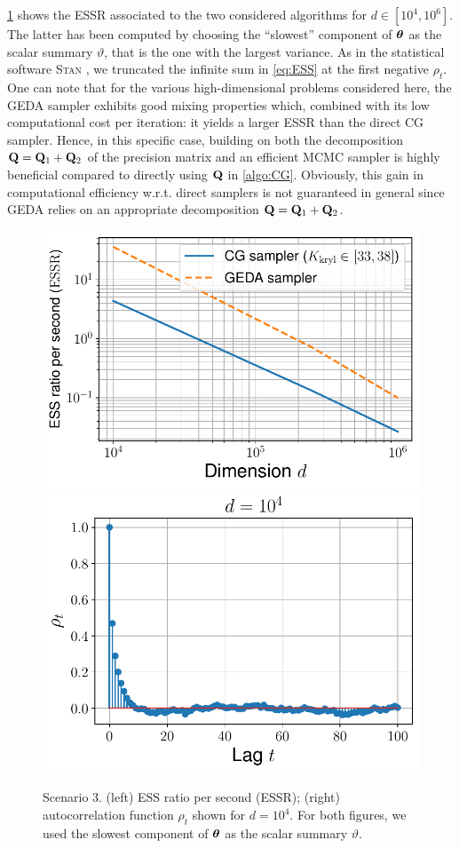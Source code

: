 \documentclass[nohypdvips,onefignum,onetabnum]{siamart171218}
\begin{document}
\cref{fig:scenario_3_results} shows the ESSR associated to the two considered algorithms for $d \in [10^4,10^6]$.
The latter has been computed by choosing the ``slowest'' component of $\boldsymbol{\theta}$ as the scalar summary $\vartheta$, that is the one with the largest variance.
As in the statistical software \textsc{Stan} \cite{Stan2017}, we truncated the infinite sum in \cref{eq:ESS} at the first negative $\rho_t$.
One can note that for the various high-dimensional problems considered here, the GEDA sampler exhibits good mixing properties which, combined with its low computational cost per iteration: it yields a larger ESSR than the direct CG sampler.
Hence, in this specific case, building on both the decomposition $\mathbf{Q} = \mathbf{Q}_1 + \mathbf{Q}_2$ of the precision matrix and an efficient MCMC sampler is highly beneficial compared to directly using $\mathbf{Q}$ in \cref{algo:CG}.
Obviously, this gain in computational efficiency w.r.t. direct samplers is not guaranteed in general since GEDA relies on an appropriate decomposition $\mathbf{Q} = \mathbf{Q}_1 + \mathbf{Q}_2$.
%
\begin{figure}
  \mbox{{\includegraphics[scale=0.45]{images/simu3_ESS_bis.pdf}}}
  \mbox{{\includegraphics[scale=0.45]{images/simu3_acf.pdf}}}
  \caption{Scenario 3. (left) ESS ratio per second (ESSR); (right) autocorrelation function $\rho_t$ shown for $d=10^4$.
  For both figures, we used the slowest component of $\boldsymbol{\theta}$ as the scalar summary $\vartheta$.}
\label{fig:scenario_3_results}
\end{figure}
\end{document}
